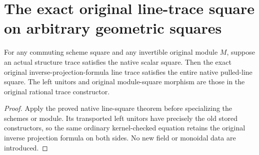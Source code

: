 \section{The exact original line-trace square on arbitrary geometric squares}

\begin{lemma}
\label{lem:kn-original-line-trace-native-square}
\leanok
For any commuting scheme square and any invertible original module $M$, suppose
an actual structure trace satisfies the native scalar square. Then the exact
original inverse-projection-formula line trace satisfies the entire native
pulled-line square. The left unitors and original module-square morphism are
those in the original rational trace constructor.
\end{lemma}
\begin{proof}
Apply the proved native line-square theorem before specializing the schemes or
module. Its transported left unitors have precisely the old stored constructors,
so the same ordinary kernel-checked equation retains the original inverse
projection formula on both sides. No new field or monoidal data are introduced.
\end{proof}

